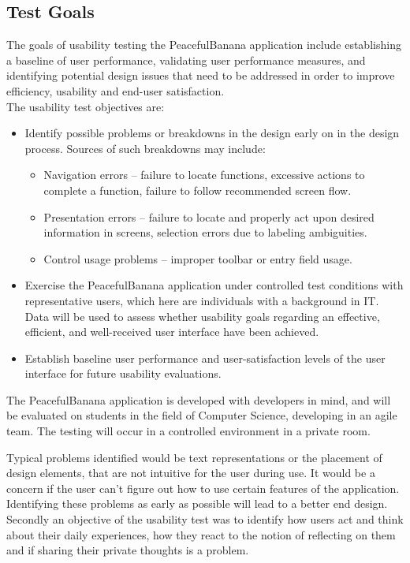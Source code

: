 \subsection{Test Goals}
The goals of usability testing the PeacefulBanana application include establishing a baseline of user performance, validating user performance measures, and identifying potential design issues that need to be addressed in order to improve efficiency, usability and end-user satisfaction. \\
The usability test objectives are:
\begin{itemize}
	\item Identify possible problems or breakdowns in the design\cite{ref:30} early on in the design process. Sources of such breakdowns may include:
		\begin{itemize}
			\item Navigation errors – failure to locate functions, excessive actions to complete a function, failure to follow recommended screen flow.
			\item Presentation errors – failure to locate and properly act upon desired information in screens, selection errors due to labeling ambiguities.
			\item Control usage problems – improper toolbar or entry field usage.
		\end{itemize}
	\item Exercise the PeacefulBanana application under controlled test conditions with representative users, which here are individuals with a background in IT. Data will be used to assess whether usability goals regarding an effective, efficient, and well-received user interface have been achieved.
	\item Establish baseline user performance and user-satisfaction levels of the user interface for future usability evaluations.
\end{itemize}
The PeacefulBanana application is developed with developers in mind, and will be evaluated on students in the field of Computer Science, developing in an agile team. The testing will occur in a controlled environment in a private room.

Typical problems identified would be text representations or the placement of design elements, that are not intuitive for the user during use. It would be a concern if the user can't figure out how to use certain features of the application. Identifying these problems as early as possible will lead to a better end design. \\
Secondly an objective of the usability test was to identify how users act and think about their daily experiences, how they react to the notion of reflecting on them and if sharing their private thoughts is a problem. 
